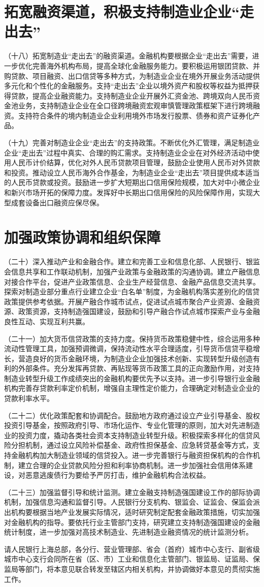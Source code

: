 \section{拓宽融资渠道，积极支持制造业企业“走出去”}

（十八）拓宽制造业“走出去”的融资渠道。金融机构要根据企业“走出去”需要，进一步优化完善海外机构布局，提高全球化金融服务能力。要积极运用银团贷款、并购贷款、项目融资、出口信贷等多种方式，为制造业企业在境外开展业务活动提供多元化和个性化的金融服务。支持“走出去”企业以境外资产和股权等权益为抵押获得贷款，提高企业融资能力。支持制造业企业开展外汇资金池、跨境双向人民币资金池业务，支持制造业企业在全口径跨境融资宏观审慎管理政策框架下进行跨境融资。支持符合条件的境内制造业企业利用境外市场发行股票、债券和资产证券化产品。

（十九）完善对制造业企业“走出去”的支持政策。不断优化外汇管理，满足制造业企业“走出去”过程中真实、合理的购汇需求。支持制造业企业在对外经济活动中使用人民币计价结算，优化对外人民币贷款项目管理，鼓励企业使用人民币对外贷款和投资。推动设立人民币海外合作基金，为制造业企业“走出去”项目提供成本适当的人民币贷款或投资。鼓励进一步扩大短期出口信用保险规模，加大对中小微企业和新兴市场开拓的保障力度。发挥好中长期出口信用保险的风险保障作用，实现大型成套设备出口融资应保尽保。

\section{加强政策协调和组织保障}

（二十）深入推动产业和金融合作。建立和完善工业和信息化部、人民银行、银监会信息共享和工作联动机制，加强产业政策与金融政策的沟通协调。建立产融信息对接合作平台，促进产业政策信息、企业生产经营信息、金融产品信息交流共享。探索对制造业部分重点行业建立企业“白名单”制度，为金融机构落实差别化的信贷政策提供参考依据。开展产融合作城市试点，促进试点城市聚合产业资源、金融资源、政策资源，支持制造强国建设，鼓励和引导产融合作试点城市探索产业与金融良性互动、实现互利共赢。

（二十一）加大货币信贷政策的支持力度。保持货币政策稳健中性，综合运用多种流动性管理工具，加强预调微调，保持流动性水平合理适度，引导货币信贷平稳增长，营造良好的货币金融环境，为制造业企业加强技术创新、实现转型升级创造有利的外部条件。充分发挥再贷款、再贴现等货币政策工具的正向激励作用，对支持制造业转型升级工作成绩突出的金融机构要优先予以支持。进一步引导银行业金融机构完善存贷款利率定价机制，增强自主理性定价能力，合理确定对制造业企业的贷款利率水平。

（二十二）优化政策配套和协调配合。鼓励地方政府通过设立产业引导基金、股权投资引导基金，按照政府引导、市场化运作、专业化管理的原则，加大对先进制造业的投资力度，撬动各类社会资本支持制造业转型升级。积极探索多样化的信贷风险分担机制，通过设立风险补偿基金、政府性担保基金、应急转贷基金等方式，支持金融机构加大制造业领域的信贷投入。进一步完善银行与融资担保机构的合作机制，建立合理的企业贷款风险分担和利率协商机制。进一步加强社会信用体系建设，对恶意逃废债行为要给予严厉打击，维护金融机构合法权益。

（二十三）加强监督引导和统计监测。建立金融支持制造强国建设工作的部际协调机制，加强信息沟通和监督引导。人民银行分支机构、银监会、证监会、保监会派出机构要根据当地产业发展实际情况，适时研究制定配套金融政策措施，切实加强对金融机构的指导。要依托行业主管部门支持，研究建立支持制造强国建设的金融统计制度，进一步加强对高技术制造业、先进制造业融资情况的统计监测分析。

请人民银行上海总部，各分行、营业管理部、省会（首府）城市中心支行、副省级城市中心支行会同所在省（区、市）工业和信息化主管部门、银监局、证监局、保监局等部门，将本意见联合转发至辖区内相关机构，并协调做好本意见的贯彻实施工作。

